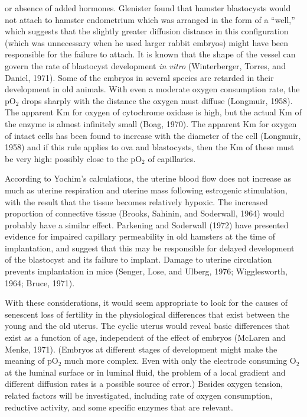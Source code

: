 or absence of added hormones. Glenister found that hamster blastocysts would not attach to hamster endometrium which was arranged in the form of a ``well,'' which suggests that the slightly greater diffusion distance in this configuration (which was unnecessary when he used larger rabbit embryos) might have been responsible for the
failure to attach. It is known that the shape of the vessel can govern the rate of blastocyst development \textit{in vitro} (Winterberger, Torres, and Daniel, 1971). Some of the embryos in several species are retarded in their development in old animals. With even a moderate oxygen consumption rate, the pO$_{2}$ drops sharply with the distance the oxygen must diffuse
(Longmuir, 1958). The apparent Km for oxygen of cytochrome oxidase is high, but the actual Km of the enzyme is almost infinitely small (Boag, 1970). The apparent Km for oxygen of intact cells has been found to increase with the diameter of the cell (Longmuir, 1958) and if this rule applies to ova and blastocysts, then the Km of these must be
very high: possibly close to the pO$_{2}$ of capillaries.

According to Yochim's calculations, the uterine blood flow does not increase as much as uterine respiration and uterine mass following estrogenic stimulation, with the result that the tissue becomes relatively hypoxic. The increased proportion of connective tissue (Brooks, Sahinin, and Soderwall, 1964) would probably have a similar effect. Parkening and Soderwall
(1972) have presented evidence for impaired capillary permeability in old hamsters at the time of implantation, and suggest that this may be responsible for delayed development of the blastocyst and its failure to implant. Damage to uterine circulation prevents implantation in mice (Senger, Lose, and Ulberg, 1976; Wigglesworth, 1964; Bruce, 1971).

With these considerations, it would seem appropriate to look for the causes of senescent loss of fertility in the physiological differences that exist between the young and the old uterus. The cyclic uterus would reveal basic differences that exist as a function of age, independent of the effect of embryos (McLaren and Menke, 1971). (Embryos
at different stages of development might make the meaning of pO$_{2}$ much more complex. Even with only the electrode consuming O$_{2}$ at the luminal surface or in luminal fluid, the problem of a local gradient and different diffusion rates is a possible source of error.) Besides oxygen tension, related factors will be investigated, including
rate of oxygen consumption, reductive activity, and some specific enzymes that are relevant.